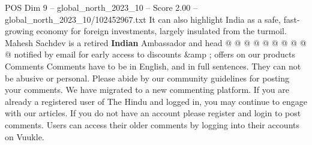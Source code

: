 \begin{textsample}{POS Dim 9 – global\_north\_2023\_10 – Score 2.00 – global\_north\_2023\_10/102452967.txt}
It can also highlight India as a safe, fast-growing economy for foreign investments, largely insulated from the turmoil.
Mahesh Sachdev is a retired \textbf{Indian} Ambassador and head @ @ @ @ @ @ @ @ @ @ notified by email for early access to discounts \&amp ; offers on our products Comments Comments have to be in English, and in full sentences.
They can not be abusive or personal.
Please abide by our community guidelines for posting your comments.
We have migrated to a new commenting platform.
If you are already a registered user of The Hindu and logged in, you may continue to engage with our articles.
If you do not have an account please register and login to post comments.
Users can access their older comments by logging into their accounts on Vuukle.

\end{textsample}
